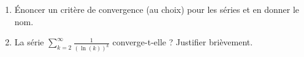\begin{exercice}\label{exoJanvier004}

\begin{enumerate}

\item
Énoncer un critère de convergence (au choix) pour les séries et en donner le nom.

\item
La série $\sum_{k=2}^{\infty}\frac{1}{ (\ln(k))^k }$ converge-t-elle ? Justifier brièvement.

\end{enumerate}


\end{exercice}
